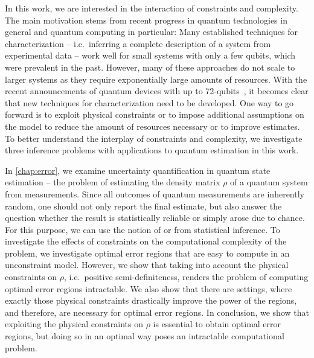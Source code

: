 In this work, we are interested in the interaction of constraints and complexity.
The main motivation stems from recent progress in quantum technologies in general and quantum computing in particular:
Many established techniques for characterization -- i.e.\ inferring a complete description of a system from experimental data -- work well for small systems with only a few qubits, which were prevalent in the past.
However, many of these approaches do not scale to larger systems as they require exponentially large amounts of resources.
With the recent announcements of quantum devices with up to 72-qubits~\cite{ConoverGooglemovesquantum2018}, it becomes clear that new techniques for characterization need to be developed.
One way to go forward is to exploit physical constraints or to impose additional assumptions on the model to reduce the amount of resources necessary or to improve estimates.
To better understand the interplay of constraints and complexity, we investigate three inference problems with applications to quantum estimation in this work.

In \cref{chap:error}, we examine uncertainty quantification in quantum state estimation -- the problem of estimating the density matrix $\rho$ of a quantum system from measurements.
Since all outcomes of quantum measurements are inherently random, one should not only report the final estimate, but also answer the question whether the result is statistically reliable or simply arose due to chance.
For this purpose, we can use the notion of  or  from statistical inference.
To investigate the effects of constraints on the computational complexity of the problem, we investigate optimal error regions that are easy to compute in an unconstraint model.
However, we show that taking into account the physical constraints on $\rho$, i.e.\ positive semi-definiteness, renders the problem of computing optimal error regions intractable.
We also show that there are settings, where exactly those physical constraints drastically improve the power of the regions, and therefore, are necessary for optimal error regions.
In conclusion, we show that exploiting the physical constraints on $\rho$ is essential to obtain optimal error regions, but doing so in an optimal way poses an intractable computational problem.


